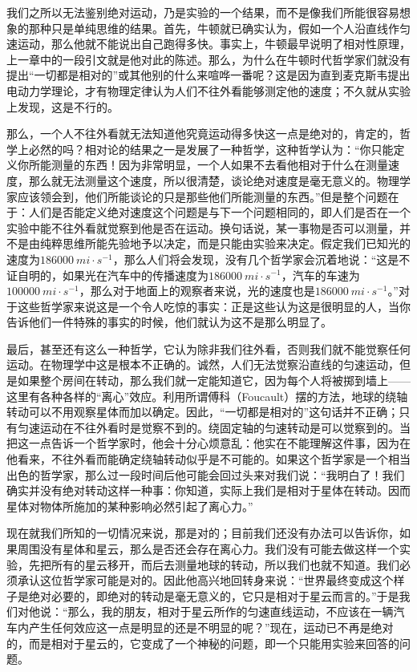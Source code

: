 我们之所以无法鉴别绝对运动，乃是实验的一个结果，而不是像我们所能很容易想象的那种只是单纯思维的结果。首先，牛顿就已确实认为，假如一个人沿直线作匀速运动，那么他就不能说出自己跑得多快。事实上，牛顿最早说明了相对性原理，上一章中的一段引文就是他对此的陈述。那么，为什么在牛顿时代哲学家们就没有提出“一切都是相对的”或其他别的什么来喧哗一番呢？这是因为直到麦克斯韦提出电动力学理论，才有物理定律认为人们不往外看能够测定他的速度；不久就从实验上发现，这是不行的。

那么，一个人不往外看就无法知道他究竟运动得多快这一点是绝对的，肯定的，哲学上必然的吗？相对论的结果之一是发展了一种哲学，这种哲学认为：“你只能定义你所能测量的东西！因为非常明显，一个人如果不去看他相对于什么在测量速度，那么就无法测量这个速度，所以很清楚，谈论绝对速度是毫无意义的。物理学家应该领会到，他们所能谈论的只是那些他们所能测量的东西。”但是整个问题在于：人们是否能定义绝对速度这个问题是与下一个问题相同的，即人们是否在一个实验中能不往外看就觉察到他是否在运动。换句话说，某一事物是否可以测量，并不是由纯粹思维所能先验地予以决定，而是只能由实验来决定。假定我们已知光的速度为$186000~mi \cdot s^{-1}$，那么人们将会发现，没有几个哲学家会沉着地说：“这是不证自明的，如果光在汽车中的传播速度为$186000~mi \cdot s^{-1}$，汽车的车速为$100000~mi \cdot s^{-1}$，那么对于地面上的观察者来说，光的速度也是$186000~mi \cdot s^{-1}$。”对于这些哲学家来说这是一个令人吃惊的事实：正是这些认为这是很明显的人，当你告诉他们一件特殊的事实的时候，他们就认为这不是那么明显了。

最后，甚至还有这么一种哲学，它认为除非我们往外看，否则我们就不能觉察任何运动。在物理学中这是根本不正确的。诚然，人们无法觉察沿直线的匀速运动，但是如果整个房间在转动，那么我们就一定能知道它，因为每个人将被掷到墙上——这里有各种各样的“离心”效应。利用所谓傅科（Foucault）摆的方法，地球的绕轴转动可以不用观察星体而加以确定。因此，“一切都是相对的”这句话并不正确；只有匀速运动在不往外看时是觉察不到的。绕固定轴的匀速转动是可以觉察到的。当把这一点告诉一个哲学家时，他会十分心烦意乱：他实在不能理解这件事，因为在他看来，不往外看而能确定绕轴转动似乎是不可能的。如果这个哲学家是一个相当出色的哲学家，那么过一段时间后他可能会回过头来对我们说：“我明白了！我们确实并没有绝对转动这样一种事：你知道，实际上我们是相对于星体在转动。因而星体对物体所施加的某种影响必然引起了离心力。”

现在就我们所知的一切情况来说，那是对的；目前我们还没有办法可以告诉你，如果周围没有星体和星云，那么是否还会存在离心力。我们没有可能去做这样一个实验，先把所有的星云移开，而后去测量地球的转动，所以我们也就不知道。我们必须承认这位哲学家可能是对的。因此他高兴地回转身来说：“世界最终变成这个样子是绝对必要的，即绝对的转动是毫无意义的，它只是相对于星云而言的。”于是我们对他说：“那么，我的朋友，相对于星云所作的匀速直线运动，不应该在一辆汽车内产生任何效应这一点是明显的还是不明显的呢？”现在，运动已不再是绝对的，而是相对于星云的，它变成了一个神秘的问题，即一个只能用实验来回答的问题。

